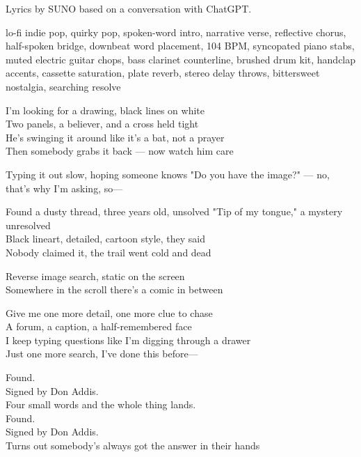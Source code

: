 
\begin{notes}
Lyrics by SUNO based on a conversation with ChatGPT.
\end{notes}
\begin{style}
lo-fi indie pop, quirky pop, spoken-word intro, narrative verse, reflective chorus, half-spoken bridge, downbeat word placement, 104 BPM, syncopated piano stabs, muted electric guitar chops, bass clarinet counterline, brushed drum kit, handclap accents, cassette saturation, plate reverb, stereo delay throws, bittersweet nostalgia, searching resolve
\end{style}
\begin{lyrics}
I'm looking for a drawing, black lines on white\\
Two panels, a believer, and a cross held tight\\
He's swinging it around like it's a bat, not a prayer\\
Then somebody grabs it back — now watch him care

Typing it out slow, hoping someone knows
"Do you have the image?" — no, that's why I'm asking, so—

Found a dusty thread, three years old, unsolved
"Tip of my tongue," a mystery unresolved\\
Black lineart, detailed, cartoon style, they said\\
Nobody claimed it, the trail went cold and dead

Reverse image search, static on the screen\\
Somewhere in the scroll there's a comic in between

Give me one more detail, one more clue to chase\\
A forum, a caption, a half-remembered face\\
I keep typing questions like I'm digging through a drawer\\
Just one more search, I've done this before—

Found.\\
Signed by Don Addis.\\
Four small words and the whole thing lands.\\
Found.\\
Signed by Don Addis.\\
Turns out somebody's always got the answer in their hands


\end{lyrics}
